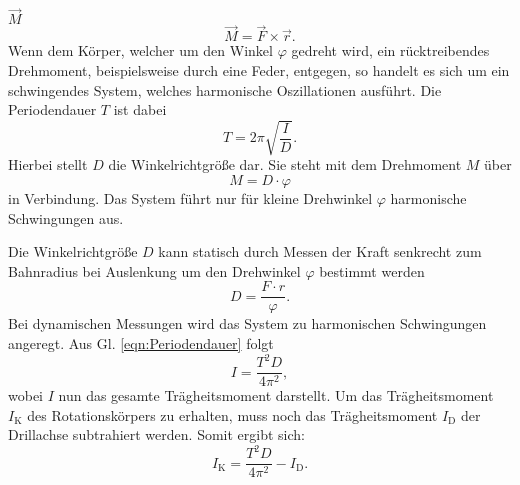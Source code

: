 $\vec{M}$
\begin{equation}
\vec{M} = \vec{F} \times \vec{r}.
\end{equation}
Wenn dem Körper, welcher um den Winkel $\varphi$ gedreht wird,
ein rücktreibendes Drehmoment, beispielsweise durch eine Feder,
entgegen, so handelt es sich um ein schwingendes System, welches
harmonische Oszillationen ausführt. Die Periodendauer $T$ ist dabei
\begin{equation}
T = 2\pi \sqrt{\frac{I}{D}}.
\label{eqn:Periodendauer}
\end{equation}
Hierbei stellt $D$ die Winkelrichtgröße dar. Sie steht mit
dem Drehmoment $M$ über
\begin{equation}
M = D \cdot \varphi
\end{equation}
in Verbindung. Das System führt nur für kleine
Drehwinkel $\varphi$ harmonische Schwingungen aus.
\par
Die Winkelrichtgröße $D$ kann statisch durch Messen der Kraft
senkrecht zum Bahnradius bei Auslenkung um den Drehwinkel $\varphi$
bestimmt werden
\begin{equation}
\label{eqn:winkelrichtgroeße}
D = \frac{F \cdot r}{\varphi}.
\end{equation}
Bei dynamischen Messungen wird das System zu harmonischen
Schwingungen angeregt. Aus Gl. \eqref{eqn:Periodendauer} folgt
\begin{equation*}
I = \frac{T^2D}{4\pi^2},
\end{equation*}
wobei $I$ nun das gesamte Trägheitsmoment darstellt. Um das
Trägheitsmoment $I_{\text{K}}$ des Rotationskörpers zu erhalten,
muss noch das Trägheitsmoment $I_{\text{D}}$ der Drillachse
subtrahiert werden. Somit ergibt sich:
\begin{equation}
  \label{eqn:taegheitsmoment}
I_{\text{K}} = \frac{T^2D}{4\pi^2} - I_{\text{D}}.
\end{equation}


\cite{sample}
